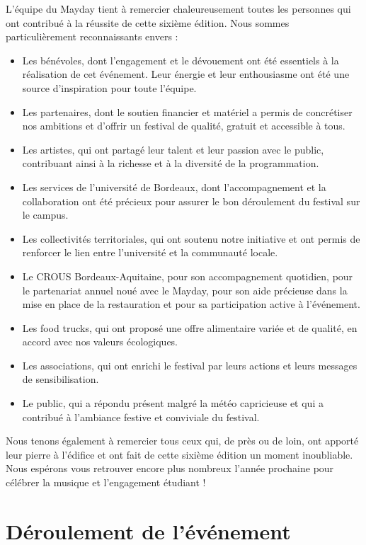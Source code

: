 \documentclass[12pt,a4paper]{report}
\begin{document}
L’équipe du Mayday tient à remercier chaleureusement toutes les personnes qui ont contribué à la réussite de cette sixième édition. Nous sommes particulièrement reconnaissants envers :
\begin{itemize}
\item Les bénévoles, dont l’engagement et le dévouement ont été essentiels à la réalisation de cet événement. Leur énergie et leur enthousiasme ont été une source d’inspiration pour toute l’équipe.
\item Les partenaires, dont le soutien financier et matériel a permis de concrétiser nos ambitions et d’offrir un festival de qualité, gratuit et accessible à tous.
\item Les artistes, qui ont partagé leur talent et leur passion avec le public, contribuant ainsi à la richesse et à la diversité de la programmation.
\item Les services de l’université de Bordeaux, dont l’accompagnement et la collaboration ont été précieux pour assurer le bon déroulement du festival sur le campus.
\item Les collectivités territoriales, qui ont soutenu notre initiative et ont permis de renforcer le lien entre l’université et la communauté locale.
\item Le CROUS Bordeaux-Aquitaine, pour son accompagnement quotidien, pour le partenariat annuel noué avec le Mayday, pour son aide précieuse dans la mise en place de la restauration et pour sa participation active à l’événement.
\item Les food trucks, qui ont proposé une offre alimentaire variée et de qualité, en accord avec nos valeurs écologiques.
\item Les associations, qui ont enrichi le festival par leurs actions et leurs messages de sensibilisation.
\item Le public, qui a répondu présent malgré la météo capricieuse et qui a contribué à l’ambiance festive et conviviale du festival.
\end{itemize}
Nous tenons également à remercier tous ceux qui, de près ou de loin, ont apporté leur pierre à l’édifice et ont fait de cette sixième édition un moment inoubliable. Nous espérons vous retrouver encore plus nombreux l’année prochaine pour célébrer la musique et l’engagement étudiant !

\chapter{Déroulement de l'événement}
\end{document}
